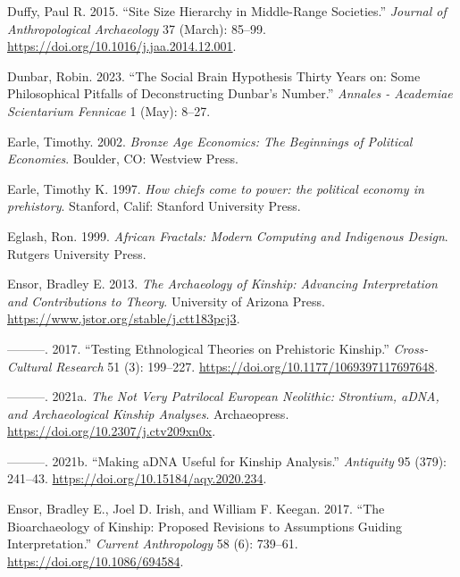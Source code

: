 \documentclass[
  12pt,
  a4paper, twoside]{book}
\newlength{\cslhangindent}
\newlength{\cslentryspacingunit} %
\newenvironment{CSLReferences}[2] %
 {%
  \setlength{\parindent}{0pt}
  \ifodd #1
  \let\oldpar\par
  \def\par{\hangindent=\cslhangindent\oldpar}
  \fi
  \setlength{\parskip}{#2\cslentryspacingunit}
 }%
 {}
\begin{document}
\begin{CSLReferences}{1}{0}
\leavevmode{}%
Duffy, Paul R. 2015. {``Site Size Hierarchy in Middle-Range Societies.''} \emph{Journal of Anthropological Archaeology} 37 (March): 85--99. \url{https://doi.org/10.1016/j.jaa.2014.12.001}.

\leavevmode{}%
Dunbar, Robin. 2023. {``The Social Brain Hypothesis Thirty Years on: Some Philosophical Pitfalls of Deconstructing Dunbar's Number.''} \emph{Annales - Academiae Scientarium Fennicae} 1 (May): 8--27.

\leavevmode{}%
Earle, Timothy. 2002. \emph{Bronze Age Economics: The Beginnings of Political Economies}. Boulder, CO: Westview Press.

\leavevmode{}%
Earle, Timothy K. 1997. \emph{How chiefs come to power: the political economy in prehistory}. Stanford, Calif: Stanford University Press.

\leavevmode{}%
Eglash, Ron. 1999. \emph{African Fractals: Modern Computing and Indigenous Design}. Rutgers University Press.

\leavevmode{}%
Ensor, Bradley E. 2013. \emph{The Archaeology of Kinship: Advancing Interpretation and Contributions to Theory}. University of Arizona Press. \url{https://www.jstor.org/stable/j.ctt183pcj3}.

\leavevmode{}%
---------. 2017. {``Testing Ethnological Theories on Prehistoric Kinship.''} \emph{Cross-Cultural Research} 51 (3): 199--227. \url{https://doi.org/10.1177/1069397117697648}.

\leavevmode{}%
---------. 2021a. \emph{The Not Very Patrilocal European Neolithic: Strontium, aDNA, and Archaeological Kinship Analyses}. Archaeopress. \url{https://doi.org/10.2307/j.ctv209xn0x}.

\leavevmode{}%
---------. 2021b. {``Making aDNA Useful for Kinship Analysis.''} \emph{Antiquity} 95 (379): 241--43. \url{https://doi.org/10.15184/aqy.2020.234}.

\leavevmode{}%
Ensor, Bradley E., Joel D. Irish, and William F. Keegan. 2017. {``The Bioarchaeology of Kinship: Proposed Revisions to Assumptions Guiding Interpretation.''} \emph{Current Anthropology} 58 (6): 739--61. \url{https://doi.org/10.1086/694584}.


\end{CSLReferences}
\end{document}
